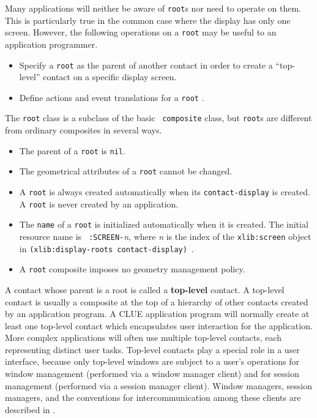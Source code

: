 Many applications will neither be aware of {\tt root}s nor need  to
operate on them. This is particularly true in the common case where the display
has only one screen.
However, the following operations on a {\tt root}
may be useful to an application programmer. 
\begin{itemize}
\item Specify a {\tt root} as the parent of another contact in order
to create a ``top-level'' contact on a specific display screen.
\item Define actions and event translations for a {\tt root}
\footnotemark{}.  
\end{itemize}

The {\tt root} class is a subclass of the basic {\tt
composite} class,
but {\tt root}s are different from ordinary composites in several ways.
\begin{itemize}
\item The parent of a {\tt root} is {\tt nil}.
\item The geometrical attributes of a {\tt root} cannot be changed.
\item A {\tt root} is always created automatically when its
{\tt contact-display} is created. A {\tt root} is never created by an
application.  \item The {\tt name} of a {\tt root} is
initialized automatically when it is created.  The initial resource name is {\tt
:SCREEN-}{\em n}, where {\em n} is the index of the
{\tt xlib:screen} object in {\tt (xlib:display-roots
contact-display)}~\footnotemark{}.
\item A {\tt root} composite imposes no geometry management policy.
\end{itemize}




A contact whose parent is a root is called a {\bf
top-level} contact.  A top-level contact is usually
a composite at the top of a hierarchy
of other contacts created by an application program.  A CLUE application program
will
normally create at least one top-level contact which encapsulates user
interaction for the application.  More complex applications will often use multiple
top-level contacts, each representing distinct user tasks.  Top-level contacts
play a special role in a user interface, because only top-level windows are
subject to a user's operations for window management (performed via a window
manager client) and for session management (performed via a session manager
client).  Window managers, session managers, and the conventions for
intercommunication among these clients are described in \cite{icccm}.

